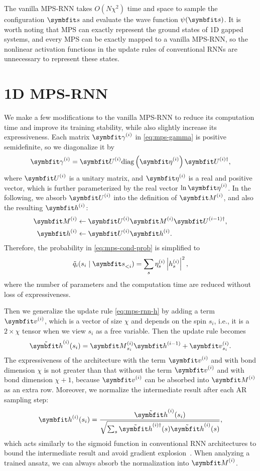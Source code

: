 The vanilla MPS-RNN takes $O(N \chi^2)$ time and space to sample the configuration $\vs$ and evaluate the wave function $\psi(\vs)$. It is worth noting that MPS can exactly represent the ground states of 1D gapped systems, and every MPS can be exactly mapped to a vanilla MPS-RNN, so the nonlinear activation functions in the update rules of conventional RNNs are unnecessary to represent these states.

\section{1D MPS-RNN}

We make a few modifications to the vanilla MPS-RNN to reduce its computation time and improve its training stability, while also slightly increase its expressiveness. Each matrix $\mga^{(i)}$ in \cref{eq:mps-gamma} is positive semidefinite, so we diagonalize it by
\begin{equation}
\mga^{(i)} = \mU^{(i)} \diag\left( \vet^{(i)} \right) \mU^{(i) \dagger},
\end{equation}
where $\mU^{(i)}$ is a unitary matrix, and $\vet^{(i)}$ is a real and positive vector, which is further parameterized by the real vector $\ln \vet^{(i)}$. In the following, we absorb $\mU^{(i)}$ into the definition of $\mM^{(i)}$, and also the resulting $\vh^{(i)}$:
\begin{align}
\mM^{(i)} &\gets \mU^{(i)} \mM^{(i)} \mU^{(i - 1) \dagger}, \\
\vh^{(i)} &\gets \mU^{(i)} \vh^{(i)}.
\end{align}
Therefore, the probability in \cref{eq:mps-cond-prob} is simplified to
\begin{equation}
\tilde{q}_i(s_i \mid \vs_{< i}) = \sum_s \eta^{(i)}_s \left| h^{(i)}_s \right|^2,
\label{eq:mps-rnn-p-eta}
\end{equation}
where the number of parameters and the computation time are reduced without loss of expressiveness.

Then we generalize the update rule \cref{eq:mps-rnn-h} by adding a term $\vv^{(i)}$, which is a vector of size $\chi$ and depends on the spin $s_i$, i.e., it is a $2 \times \chi$ tensor when we view $s_i$ as a free variable. Then the update rule becomes
\begin{equation}
\tilde{\vh}^{(i)}(s_i) = \mM^{(i)}_{s_i} \vh^{(i - 1)} + \vv^{(i)}_{s_i}.
\label{eq:mps-rnn-h-v}
\end{equation}
The expressiveness of the architecture with the term $\vv^{(i)}$ and with bond dimension $\chi$ is not greater than that without the term $\vv^{(i)}$ and with bond dimension $\chi + 1$, because $\vv^{(i)}$ can be absorbed into $\mM^{(i)}$ as an extra row. Moreover, we normalize the intermediate result after each AR sampling step:
\begin{equation}
\vh^{(i)}(s_i) = \frac
{\tilde{\vh}^{(i)}(s_i)}
{\sqrt{\sum_s \tilde{\vh}^{(i) \dagger}(s) \tilde{\vh}^{(i)}(s)}},
\end{equation}
which acts similarly to the sigmoid function in conventional RNN architectures to bound the intermediate result and avoid gradient explosion~\cite{pascanu2013difficulty}. When analyzing a trained ansatz, we can always absorb the normalization into $\mM^{(i)}$.

